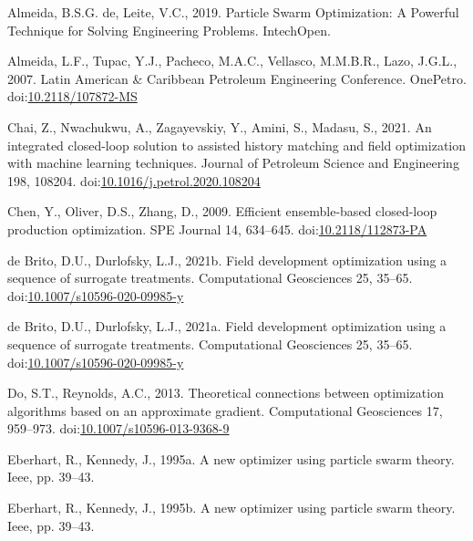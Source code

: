 \documentclass[]{elsarticle} %
\newlength{\cslhangindent}
\newenvironment{CSLReferences}[2] %
 {%
  \setlength{\parindent}{0pt}
  \ifodd #1 \everypar{\setlength{\hangindent}{\cslhangindent}}\ignorespaces\fi
  \ifnum #2 > 0
  \setlength{\parskip}{#2\baselineskip}
  \fi
 }%
 {}
\begin{document}
\hypertarget{refs}{}
\begin{CSLReferences}{1}{0}
\leavevmode{}%
Almeida, B.S.G. de, Leite, V.C., 2019. Particle Swarm Optimization: A Powerful Technique for Solving Engineering Problems. IntechOpen.

\leavevmode{}%
Almeida, L.F., Tupac, Y.J., Pacheco, M.A.C., Vellasco, M.M.B.R., Lazo, J.G.L., 2007. Latin American \& Caribbean Petroleum Engineering Conference. OnePetro. doi:\href{https://doi.org/10.2118/107872-MS}{10.2118/107872-MS}

\leavevmode{}%
Chai, Z., Nwachukwu, A., Zagayevskiy, Y., Amini, S., Madasu, S., 2021. An integrated closed-loop solution to assisted history matching and field optimization with machine learning techniques. Journal of Petroleum Science and Engineering 198, 108204. doi:\href{https://doi.org/10.1016/j.petrol.2020.108204}{10.1016/j.petrol.2020.108204}

\leavevmode{}%
Chen, Y., Oliver, D.S., Zhang, D., 2009. Efficient ensemble-based closed-loop production optimization. SPE Journal 14, 634--645. doi:\href{https://doi.org/10.2118/112873-PA}{10.2118/112873-PA}

\leavevmode{}%
de Brito, D.U., Durlofsky, L.J., 2021b. Field development optimization using a sequence of surrogate treatments. Computational Geosciences 25, 35--65. doi:\href{https://doi.org/10.1007/s10596-020-09985-y}{10.1007/s10596-020-09985-y}

\leavevmode{}%
de Brito, D.U., Durlofsky, L.J., 2021a. Field development optimization using a sequence of surrogate treatments. Computational Geosciences 25, 35--65. doi:\href{https://doi.org/10.1007/s10596-020-09985-y}{10.1007/s10596-020-09985-y}

\leavevmode{}%
Do, S.T., Reynolds, A.C., 2013. Theoretical connections between optimization algorithms based on an approximate gradient. Computational Geosciences 17, 959--973. doi:\href{https://doi.org/10.1007/s10596-013-9368-9}{10.1007/s10596-013-9368-9}

\leavevmode{}%
Eberhart, R., Kennedy, J., 1995a. A new optimizer using particle swarm theory. Ieee, pp. 39--43.

\leavevmode{}%
Eberhart, R., Kennedy, J., 1995b. A new optimizer using particle swarm theory. Ieee, pp. 39--43.


\end{CSLReferences}
\end{document}
